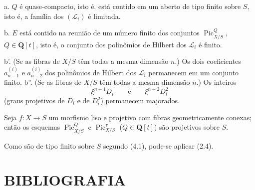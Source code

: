 \noindent a. $Q$ é quase-compacto,
isto é, está contido em um aberto de tipo finito sobre $S$, isto é, a família
dos $(\mathcal L_i)$ é limitada.

\noindent b. $E$ está contido na reunião de um número finito dos conjuntos
$\operatorname{Pic}_{X/S}^Q$, $Q\in\mathbf Q[t]$, isto é, o conjunto dos
polinômios de Hilbert dos $\mathcal L_i$ é finito.

\noindent b'. (Se as fibras de $X/S$ têm todas a mesma dimensão $n$.) Os dois
coeficientes $a_{n-1}^{(i)}$ e $a_{n-2}^{(i)}$ dos polinômios de Hilbert dos
$\mathcal L_i$ permanecem em um conjunto finito.
\noindent b''. (Se as fibras de $X/S$ têm todas a mesma dimensão $n$.) Os
inteiros
\[
\xi^{n-1}D_i\qquad\text{e}\qquad\xi^{n-2}D_i^2
\]
(graus projetivos de $D_i$ e de $D_i^2$) permanecem majorados.

 Seja $f:X\longrightarrow S$ um morfismo liso e
projetivo com fibras geometricamente conexas; então os esquemas
$\operatorname{Pic}_{X/S}^Q$ e $\operatorname{Pic}_{X/S}^\tau$
($Q\in\mathbf Q[t]$) são projetivos sobre $S$.

Como são de tipo finito sobre $S$ segundo (4.1), pode-se aplicar (2.4).

\section*{BIBLIOGRAFIA}

